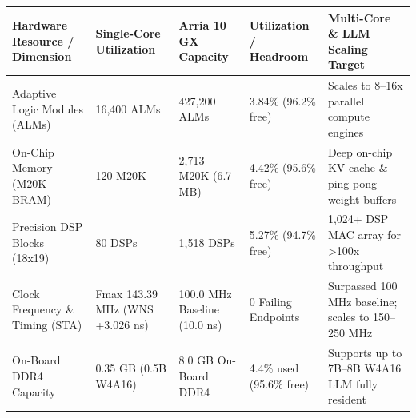 \documentclass[11pt,a4paper]{article}
\begin{document}
{\footnotesize\renewcommand{\arraystretch}{1.14}\begin{longtable}{@{}L{0.21\textwidth}L{0.16\textwidth}L{0.16\textwidth}L{0.15\textwidth}L{0.22\textwidth}@{}}\toprule

\textbf{Hardware Resource /\allowbreak{} Dimension} & \textbf{Single-Core Utilization} & \textbf{Arria 10 GX Capacity} & \textbf{Utilization /\allowbreak{} Headroom} & \textbf{Multi-Core \& LLM Scaling Target}\\\midrule\endhead

Adaptive Logic Modules (\allowbreak{}ALMs)\allowbreak{} & 16,\allowbreak{}400 ALMs & 427,\allowbreak{}200 ALMs & 3.84\% (\allowbreak{}96.2\% free)\allowbreak{} & Scales to 8--16x parallel compute engines\\[2pt]

On-Chip Memory (\allowbreak{}M20K BRAM)\allowbreak{} & 120 M20K & 2,\allowbreak{}713 M20K (\allowbreak{}6.7 MB)\allowbreak{} & 4.42\% (\allowbreak{}95.6\% free)\allowbreak{} & Deep on-chip KV cache \& ping-pong weight buffers\\[2pt]

Precision DSP Blocks (\allowbreak{}18x19)\allowbreak{} & 80 DSPs & 1,\allowbreak{}518 DSPs & 5.27\% (\allowbreak{}94.7\% free)\allowbreak{} & 1,\allowbreak{}024+\allowbreak{} DSP MAC array for >100x throughput\\[2pt]

Clock Frequency \& Timing (\allowbreak{}STA)\allowbreak{} & Fmax 143.39 MHz (\allowbreak{}WNS +\allowbreak{}3.026 ns)\allowbreak{} & 100.0 MHz Baseline (\allowbreak{}10.0 ns)\allowbreak{} & 0 Failing Endpoints & Surpassed 100 MHz baseline; scales to 150--250 MHz\\[2pt]

On-Board DDR4 Capacity & 0.35 GB (\allowbreak{}0.5B W4A16)\allowbreak{} & 8.0 GB On-Board DDR4 & 4.4\% used (\allowbreak{}95.6\% free)\allowbreak{} & Supports up to 7B--8B W4A16 LLM fully resident\\[2pt]

\bottomrule\end{longtable}}
\end{document}
